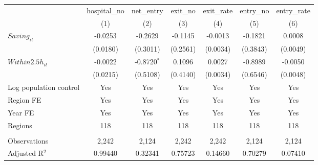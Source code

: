\begingroup
\centering
\begin{tabular}{lcccccc}
   \toprule
                          & hospital\_no  & net\_entry    & exit\_no  & exit\_rate  & entry\_no  & entry\_rate \\    
                          & (1)           & (2)           & (3)       & (4)         & (5)        & (6)\\  
   \midrule 
   $Saving_{it}$          & -0.0253       & -0.2629       & -0.1145   & -0.0013     & -0.1821    & 0.0008\\   
                          & (0.0180)      & (0.3011)      & (0.2561)  & (0.0034)    & (0.3843)   & (0.0049)\\   
   $Within2.5h_{it}$      & -0.0022       & -0.8720$^{*}$ & 0.1096    & 0.0027      & -0.8989    & -0.0050\\   
                          & (0.0215)      & (0.5108)      & (0.4140)  & (0.0034)    & (0.6546)   & (0.0048)\\   
   Log population control & Yes           & Yes           & Yes       & Yes         & Yes        & Yes\\  
   Region FE              & Yes           & Yes           & Yes       & Yes         & Yes        & Yes\\  
   Year FE                & Yes           & Yes           & Yes       & Yes         & Yes        & Yes\\  
   Regions                & 118           & 118           & 118       & 118         & 118        & 118\\  
    \\
   Observations           & 2,242         & 2,124         & 2,242     & 2,242       & 2,124      & 2,124\\  
   Adjusted R$^2$         & 0.99440       & 0.32341       & 0.75723   & 0.14660     & 0.70279    & 0.07410\\  
   \bottomrule
\end{tabular}
\par\endgroup
